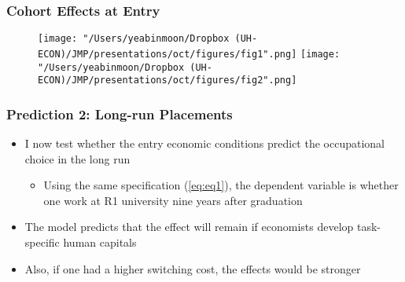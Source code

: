 \documentclass[11pt]{beamer}
\begin{document}
\begin{frame}
	\frametitle{Cohort Effects at Entry}
	\color{red}{reproduce: set the y-axis equal, make them bigger}
	\begin{figure}
		\centering
		\texttt{[image: "/Users/yeabinmoon/Dropbox (UH-ECON)/JMP/presentations/oct/figures/fig1".png]} 
		\texttt{[image: "/Users/yeabinmoon/Dropbox (UH-ECON)/JMP/presentations/oct/figures/fig2".png]} 
	\end{figure}
	
\end{frame}



\begin{frame}
	\frametitle{Prediction 2: Long-run Placements}
	\begin{itemize}
		\item I now test whether the entry economic conditions predict the occupational choice in the long run
		\begin{itemize}
			\item Using the same specification (\ref{eq:eq1}), the dependent variable is whether one work at R1 university nine years after graduation
		\end{itemize}
	\vspace{1 mm}
		\item The model predicts that the effect will remain if economists develop task-specific human capitals 
	\vspace{1 mm}
		\item Also, if one had a higher switching cost, the effects would be stronger
	\end{itemize}
\end{frame}
\end{document}
